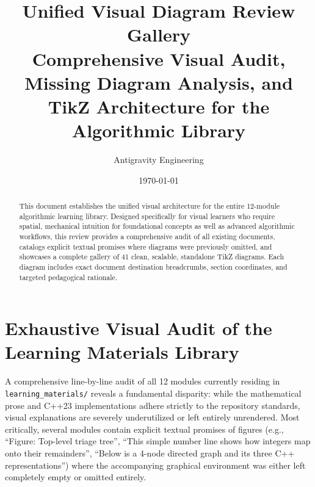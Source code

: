 \documentclass[11pt,a4paper]{article}
\title{\vspace{-1.5cm}\textbf{\Huge Unified Visual Diagram Review Gallery}\\[0.3cm]
\Large Comprehensive Visual Audit, Missing Diagram Analysis, and TikZ Architecture for the Algorithmic Library}
\author{Antigravity Engineering}
\date{\today}
\begin{document}
\maketitle

\begin{abstract}
\noindent
This document establishes the unified visual architecture for the entire 12-module algorithmic learning library. Designed specifically for visual learners who require spatial, mechanical intuition for foundational concepts as well as advanced algorithmic workflows, this review provides a comprehensive audit of all existing documents, catalogs explicit textual promises where diagrams were previously omitted, and showcases a complete gallery of 41 clean, scalable, standalone TikZ diagrams. Each diagram includes exact document destination breadcrumbs, section coordinates, and targeted pedagogical rationale.
\end{abstract}

\tableofcontents
\newpage

\section{Exhaustive Visual Audit of the Learning Materials Library}

A comprehensive line-by-line audit of all 12 modules currently residing in \texttt{learning\_materials/} reveals a fundamental disparity: while the mathematical prose and C++23 implementations adhere strictly to the repository standards, visual explanations are severely underutilized or left entirely unrendered. Most critically, several modules contain explicit textual promises of figures (e.g., ``Figure: Top-level triage tree'', ``This simple number line shows how integers map onto their remainders'', ``Below is a 4-node directed graph and its three C++ representations'') where the accompanying graphical environment was either left completely empty or omitted entirely.
\end{document}
